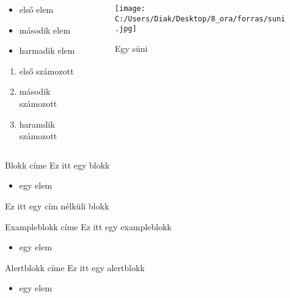 \documentclass[aspectratio=169, 12pt, xcolor={table}]{beamer}
\begin{document}
\begin{frame}
\begin{columns}[c]
\begin{column}{.5\linewidth}
\begin{itemize}
  \item első elem
  \item második elem
  \item harmadik elem
\end{itemize}
\begin{enumerate}
  \item első számozott
  \item második számozott
  \item haramdik számozott
\end{enumerate}
\end{column}
\begin{column}{.5\linewidth}
\begin{figure}[bt]
\caption{Egy süni}
\label{fig:kepek}
\texttt{[image: C:/Users/Diak/Desktop/8\_ora/forras/suni.jpg]}
\end{figure}
\end{column}
\end{columns}
\end{frame}

\begin{frame}

\begin{block}{Blokk címe}
Ez itt egy blokk
\begin{itemize}
\item egy elem
\end{itemize}
\end{block}

\begin{block}{}
Ez itt egy cím nélküli blokk
\end{block}

\begin{exampleblock}{Exampleblokk címe}
Ez itt egy exampleblokk
\begin{itemize}
\item egy elem
\end{itemize}
\end{exampleblock}

\begin{alertblock}{Alertblokk címe}
Ez itt egy alertblokk
\begin{itemize}
\item egy elem
\end{itemize}

\end{alertblock}


\end{frame}
\end{document}
